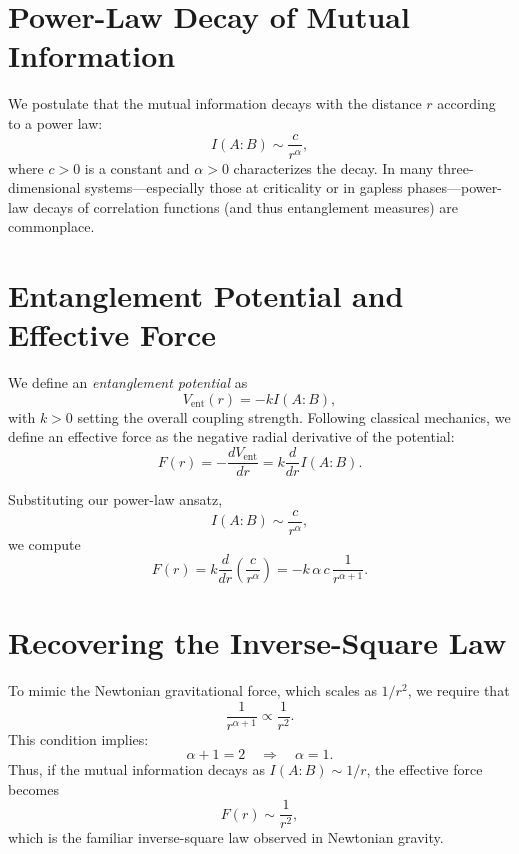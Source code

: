 \documentclass[12pt]{article}
\begin{document}
\section{Power-Law Decay of Mutual Information}
We postulate that the mutual information decays with the distance $r$ according to a power law:
\[
I(A:B) \sim \frac{c}{r^\alpha},
\]
where $c > 0$ is a constant and $\alpha > 0$ characterizes the decay. In many three-dimensional systems—especially those at criticality or in gapless phases—power-law decays of correlation functions (and thus entanglement measures) are commonplace.

\section{Entanglement Potential and Effective Force}
We define an \emph{entanglement potential} as
\[
V_{\mathrm{ent}}(r) = - k I(A:B),
\]
with $k > 0$ setting the overall coupling strength. Following classical mechanics, we define an effective force as the negative radial derivative of the potential:
\[
F(r) = - \frac{dV_{\mathrm{ent}}}{dr} = k \frac{d}{dr} I(A:B).
\]

Substituting our power-law ansatz,
\[
I(A:B) \sim \frac{c}{r^\alpha},
\]
we compute
\[
F(r) = k \frac{d}{dr} \left( \frac{c}{r^\alpha} \right) 
= -k\,\alpha\,c\,\frac{1}{r^{\alpha+1}}.
\]

\section{Recovering the Inverse-Square Law}
To mimic the Newtonian gravitational force, which scales as $1/r^2$, we require that
\[
\frac{1}{r^{\alpha+1}} \propto \frac{1}{r^2}.
\]
This condition implies:
\[
\alpha + 1 = 2 \quad \Longrightarrow \quad \alpha = 1.
\]
Thus, if the mutual information decays as $I(A:B) \sim 1/r$, the effective force becomes
\[
F(r) \sim \frac{1}{r^2},
\]
which is the familiar inverse-square law observed in Newtonian gravity.
\end{document}
